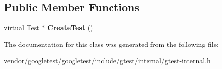 \subsection*{Public Member Functions}
\begin{DoxyCompactItemize}
\item 
virtual \hyperlink{classtesting_1_1Test}{Test} $\ast$ {\bfseries Create\+Test} ()\hypertarget{classtesting_1_1internal_1_1TestFactoryImpl_a8860c89bdb06450a5d5e8137ebd9d775}{}\label{classtesting_1_1internal_1_1TestFactoryImpl_a8860c89bdb06450a5d5e8137ebd9d775}

\end{DoxyCompactItemize}


The documentation for this class was generated from the following file\+:\begin{DoxyCompactItemize}
\item 
vendor/googletest/googletest/include/gtest/internal/gtest-\/internal.\+h\end{DoxyCompactItemize}

